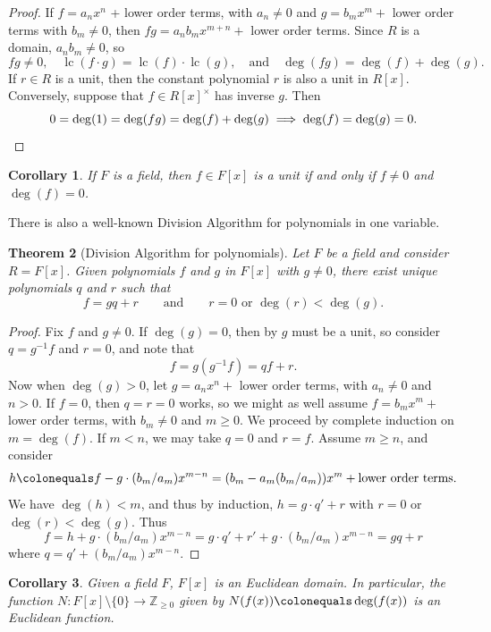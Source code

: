 \documentclass[12pt]{report}
\newtheorem{theorem}{Theorem}[chapter]
\newtheorem{corollary}[theorem]{Corollary}
\numberwithin{equation}{section}
\numberwithin{theorem}{chapter}
\theoremstyle{definition}
\newtheorem*{basic properties}{Basic Properties}
\newtheorem*{Important Remark}{Important Remark}
\newcommand{\Z}{\mathbb{Z}}
\DeclareMathOperator{\lc}{lc}
\begin{document}
\begin{proof}
If $f = a_n x^n$ + lower order terms, with $a_n \neq 0$ and $g =b_m x^m + $ lower order terms with $b_m \neq 0$, then $fg = a_n b_m x^{m+n} + $ lower order terms. 
Since $R$ is a domain, $a_n b_m \neq 0$, so
$$fg \neq 0, \quad \lc(f \cdot g) = \lc(f) \cdot \lc(g), \quad \text{and} \quad \deg(f g)=\deg(f)+\deg(g).$$
If $r \in R$ is a unit, then the constant polynomial $r$ is also a unit in $R[x]$. Conversely, suppose that $f \in R[x]^\times$ has inverse $g$. Then 
$$0 = \deg(1) = \deg(fg) = \deg(f) + \deg(g) \implies \deg(f) = \deg(g) = 0.\qedhere$$
\end{proof}


\begin{corollary}\label{units in F[x]}
	If $F$ is a field, then $f \in F[x]$ is a unit if and only if $f \neq 0$ and $\deg(f) = 0$.
\end{corollary}


There is also a well-known Division Algorithm for polynomials in one variable.


\begin{theorem}[Division Algorithm for polynomials]\label{division algorithm polynomials}
Let $F$ be a field and consider $R = F[x]$. Given polynomials $f$ and $g$ in $F[x]$ with $g \neq 0$, there exist unique polynomials $q$ and $r$ such that 
$$f = gq + r \qquad \text{and} \qquad r=0 \text{ or } \deg(r) < \deg(g).$$
\end{theorem}


\begin{proof}
Fix $f$ and $g \neq 0$.
If $\deg(g) = 0$, then by  $g$ must be a unit, so consider $q = g^{-1}f$ and $r = 0$, and note that
$$f = g(g^{-1}f) = qf+r.$$
Now when $\deg(g)>0$, let $g = a_nx^n + $ lower order terms, with $a_n \ne 0$ and $n > 0$. If $f = 0$, then $q=r=0$ works, so we might as well assume $f = b_m x^m + $ lower order terms, with $b_m \neq 0$ and $m \geqslant 0$.
We proceed by complete induction on $m = \deg(f)$. If $m < n$, we may take $q = 0$ and $r = f$. Assume $m \geqslant n$, and consider
$$h \colonequals f - g \cdot (b_m/a_m) x^{m- n} = (b_m - a_m(b_m/a_m)) x^m + \text{lower order terms}.$$
We have $\deg(h) < m$, and thus  by induction, $h = g \cdot q' + r$ with $r = 0$ or $\deg(r) < \deg(g)$. Thus
$$f = h + g \cdot (b_m/a_m) x^{m-n} =  g \cdot q' + r' + g \cdot (b_m/a_m) x^{m-n} = g q + r$$
where $q = q' + (b_m/a_m) x^{m-n}$.
\end{proof}

\begin{corollary}\label{F[x] is an euclidean domain}
Given a field $F$, $F[x]$ is an Euclidean domain. In particular, the function $N\!: F[x] \setminus \{ 0 \} \longrightarrow \Z_{\geqslant 0}$ given by $N(f(x)) \colonequals \deg(f(x))$ is an Euclidean function.
\end{corollary}
\end{document}
